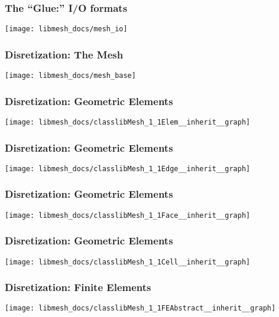 \frame
{
  \frametitle{The ``Glue:'' I/O formats}
  \begin{center}
    \texttt{[image: libmesh\_docs/mesh\_io]}
  \end{center}
}



\frame
{
  \frametitle{Disretization: The Mesh}
  \begin{center}
    \texttt{[image: libmesh\_docs/mesh\_base]}
  \end{center}
}      



\frame
{
  \frametitle{Disretization: Geometric Elements}
  \begin{center}
    \texttt{[image: libmesh\_docs/classlibMesh\_1\_1Elem\_\_inherit\_\_graph]}
  \end{center}
}      



\frame
{
  \frametitle{Disretization: Geometric Elements}
  \begin{center}
    \texttt{[image: libmesh\_docs/classlibMesh\_1\_1Edge\_\_inherit\_\_graph]}
  \end{center}
}      



\frame
{
  \frametitle{Disretization: Geometric Elements}
  \begin{center}
    \texttt{[image: libmesh\_docs/classlibMesh\_1\_1Face\_\_inherit\_\_graph]}
  \end{center}
}      



\frame
{
  \frametitle{Disretization: Geometric Elements}
  \begin{center}
    \texttt{[image: libmesh\_docs/classlibMesh\_1\_1Cell\_\_inherit\_\_graph]}
  \end{center}
}      



\frame
{
  \frametitle{Disretization: Finite Elements}
  \begin{center}
    \texttt{[image: libmesh\_docs/classlibMesh\_1\_1FEAbstract\_\_inherit\_\_graph]}
  \end{center}
}      



